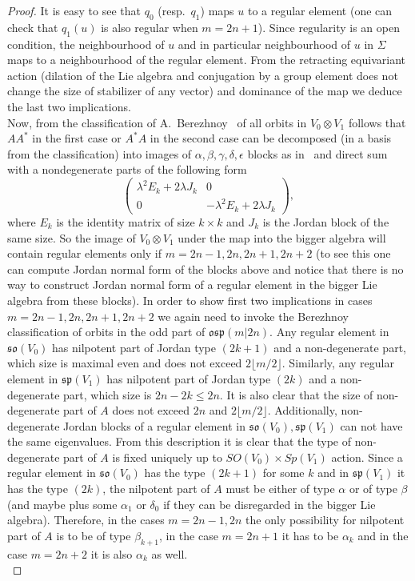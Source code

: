 \documentclass[12pt]{amsart}
\theoremstyle{definition}
\theoremstyle{remark}
\numberwithin{equation}{subsection}
\begin{document}
\begin{proof} It is easy to see that $q_0$ (resp.\ $q_1$) maps $u$ to a regular element (one can check that $q_1(u)$ is also regular when $m=2n+1$). Since regularity is an open condition, the neighbourhood of $u$ and in particular neighbourhood of $u$ in $\Sigma$ maps to a neighbourhood of the regular element.
  From the retracting equivariant action (dilation of the Lie algebra and conjugation by a group element does not change the size of stabilizer of any vector) and dominance of the map we deduce the last two implications.\\
Now, from the classification of A.~Berezhnoy~\cite{B} of all orbits in $V_0 \otimes V_1$ follows that $AA^*$ in the first case or $A^*A$ in the second case can be decomposed (in a basis from the classification) into images of $\alpha,\beta,\gamma,\delta,\epsilon$ blocks as in~\cite{KP} and direct sum with a nondegenerate parts of the following form
\begin{equation}
    \begin{pmatrix}
        \lambda^2 E_k + 2\lambda J_k & 0\\
        0 & -\lambda^2 E_k +2\lambda J_k
    \end{pmatrix},
\end{equation}
where $E_k$ is the identity matrix of size $k\times k$ and $J_k$ is the Jordan block of the same size. So the image of $V_0\otimes V_1$ under the map into the bigger algebra will contain regular elements only if $m=2n-1,2n,2n+1,2n+2$ (to see this one can compute Jordan normal form of the blocks above and notice that there is no way to construct Jordan normal form of a regular element in the bigger Lie algebra from these blocks). In order to show first two implications in cases $m=2n-1,2n,2n+1,2n+2$ we again need to invoke the Berezhnoy classification of orbits in the odd part of $\mathfrak{osp}(m|2n)$. Any regular element in $\mathfrak{so}(V_0)$ has nilpotent part of Jordan type $(2k+1)$ and a non-degenerate part, which size is maximal even and does not exceed $2\lfloor m/2 \rfloor$. Similarly, any regular element in $\mathfrak{sp}(V_1)$ has nilpotent part of Jordan type $(2k)$ and a non-degenerate part, which size is $2n-2k\le 2n$. It is also clear that the size of non-degenerate part of $A$ does not exceed $2n$ and $2\lfloor m/2 \rfloor$. Additionally, non-degenerate Jordan blocks of a regular element in $\mathfrak{so}(V_0),\mathfrak{sp}(V_1)$ can not have the same eigenvalues. From this description it is clear that the type of non-degenerate part of $A$ is fixed uniquely up to $SO(V_0)\times Sp(V_1)$ action. Since a regular element in $\mathfrak{so}(V_0)$ has the type $(2k+1)$ for some $k$ and in $\mathfrak{sp}(V_1)$  it has the type $(2k)$, the nilpotent part of $A$ must be either of type $\alpha$ or of type $\beta$ (and maybe plus some $\alpha_1$ or $\delta_0$ if they can be disregarded in the bigger Lie algebra). Therefore, in the cases $m=2n-1,2n$ the only possibility for nilpotent part of $A$ is to be of type $\beta_{k+1}$, in the case $m=2n+1$ it has to be $\alpha_k$ and in the case $m=2n+2$ it is also $\alpha_k$ as well.\\
\end{proof}
\end{document}
